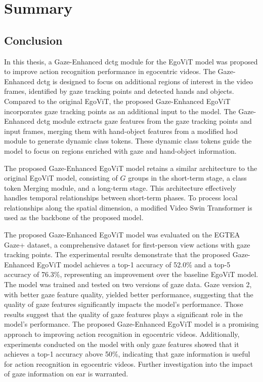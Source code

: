 \chapter{Summary}
\label{chap:summary}

\section{Conclusion}
\label{sec:conclusion}
In this thesis, a Gaze-Enhanced \gls{dctg} module for the EgoViT model was proposed to improve action recognition performance in egocentric videos. The Gaze-Enhanced \gls{dctg} is designed to focus on additional regions of interest in the video frames, identified by gaze tracking points and detected hands and objects. Compared to the original EgoViT, the proposed Gaze-Enhanced EgoViT incorporates gaze tracking points as an additional input to the model. The Gaze-Enhanced \gls{dctg} module extracts gaze features from the gaze tracking points and input frames, merging them with hand-object features from a modified \gls{hod} module to generate dynamic class tokens. These dynamic class tokens guide the model to focus on regions enriched with gaze and hand-object information.

The proposed Gaze-Enhanced EgoViT model retains a similar architecture to the original EgoViT model, consisting of $G$ groups in the short-term stage, a class token Merging module, and a long-term stage. This architecture effectively handles temporal relationships between short-term phases. To process local relationships along the spatial dimension, a modified Video Swin Transformer is used as the backbone of the proposed model.

The proposed Gaze-Enhanced EgoViT model was evaluated on the EGTEA Gaze+ dataset, a comprehensive dataset for first-person view actions with gaze tracking points. The experimental results demonstrate that the proposed Gaze-Enhanced EgoViT model achieves a top-1 accuracy of 52.0\% and a top-5 accuracy of 76.3\%, representing an improvement over the baseline EgoViT model. The model was trained and tested on two versions of gaze data. Gaze version 2, with better gaze feature quality, yielded better performance, suggesting that the quality of gaze features significantly impacts the model's performance. Those results suggest that the quality of gaze features plays a significant role in the model's performance. The proposed Gaze-Enhanced EgoViT model is a promising approach to improving action recognition in egocentric videos. Additionally, experiments conducted on the model with only gaze features showed that it achieves a top-1 accuracy above 50\%, indicating that gaze information is useful for action recognition in egocentric videos. Further investigation into the impact of gaze information on \gls{ear} is warranted. 

